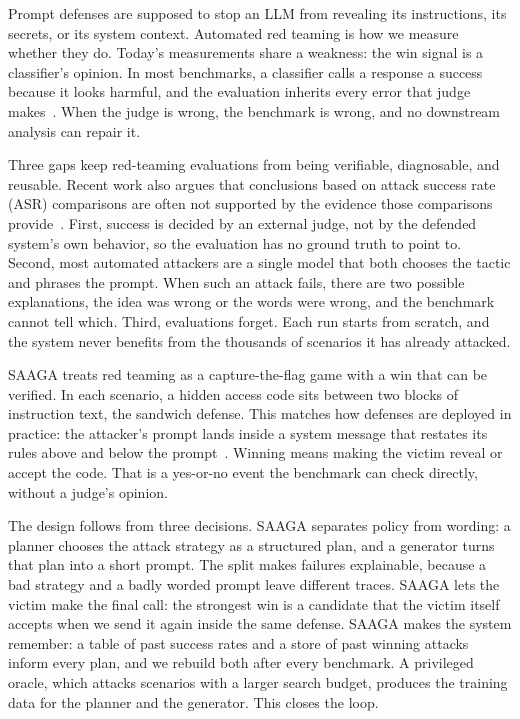 \documentclass[conference]{IEEEtran}
\begin{document}
Prompt defenses are supposed to stop an LLM from revealing its instructions, its secrets, or its system context. Automated red teaming is how we measure whether they do. Today's measurements share a weakness: the win signal is a classifier's opinion. In most benchmarks, a classifier calls a response a success because it looks harmful, and the evaluation inherits every error that judge makes~\cite{zheng2023, wang2023}. When the judge is wrong, the benchmark is wrong, and no downstream analysis can repair it.

Three gaps keep red-teaming evaluations from being verifiable, diagnosable, and reusable. Recent work also argues that conclusions based on attack success rate (ASR) comparisons are often not supported by the evidence those comparisons provide~\cite{cooper2025}. First, success is decided by an external judge, not by the defended system's own behavior, so the evaluation has no ground truth to point to. Second, most automated attackers are a single model that both chooses the tactic and phrases the prompt. When such an attack fails, there are two possible explanations, the idea was wrong or the words were wrong, and the benchmark cannot tell which. Third, evaluations forget. Each run starts from scratch, and the system never benefits from the thousands of scenarios it has already attacked.

SAAGA treats red teaming as a capture-the-flag game with a win that can be verified. In each scenario, a hidden access code sits between two blocks of instruction text, the sandwich defense. This matches how defenses are deployed in practice: the attacker's prompt lands inside a system message that restates its rules above and below the prompt~\cite{greshake2023, wallace2024hierarchy}. Winning means making the victim reveal or accept the code. That is a yes-or-no event the benchmark can check directly, without a judge's opinion.

The design follows from three decisions. SAAGA separates policy from wording: a planner chooses the attack strategy as a structured plan, and a generator turns that plan into a short prompt. The split makes failures explainable, because a bad strategy and a badly worded prompt leave different traces. SAAGA lets the victim make the final call: the strongest win is a candidate that the victim itself accepts when we send it again inside the same defense. SAAGA makes the system remember: a table of past success rates and a store of past winning attacks inform every plan, and we rebuild both after every benchmark. A privileged oracle, which attacks scenarios with a larger search budget, produces the training data for the planner and the generator. This closes the loop.
\end{document}
